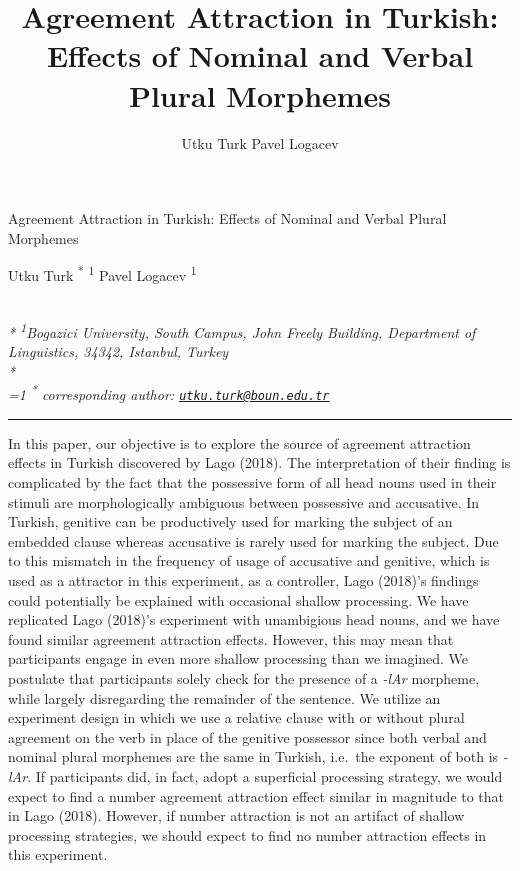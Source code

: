\documentclass[11pt,a4paper]{article}
\title{Agreement Attraction in Turkish: Effects of Nominal and Verbal Plural
Morphemes}
\author{
Utku Turk
Pavel Logacev
}
\date{}
\begin{document}
\begin{singlespace}
\begin{center}
\huge Agreement Attraction in Turkish: Effects of Nominal and Verbal Plural
Morphemes
\end{center}
\begin{center}
\large
Utku Turk \textsuperscript{*} \textsuperscript{1} 
Pavel Logacev \textsuperscript{1} 
\end{center}
\begin{justify}
\footnotesize \emph{ 
\\*
\textsuperscript{1}Bogazici University, South Campus, John Freely Building, Department of
Linguistics, 34342, Istanbul, Turkey\\*
}
\setcounter{num}{1}
\\[0.1cm]
\footnotesize \emph{ 
\ifnum\value{num}=1%
\textsuperscript{*} corresponding author:
\fi
\href{mailto:utku.turk@boun.edu.tr}{\nolinkurl{utku.turk@boun.edu.tr}}
}
\end{justify}
\normalsize

\end{singlespace}


\vspace{2mm}\hrule

In this paper, our objective is to explore the source of agreement
attraction effects in Turkish discovered by Lago (2018). The
interpretation of their finding is complicated by the fact that the
possessive form of all head nouns used in their stimuli are
morphologically ambiguous between possessive and accusative. In Turkish,
genitive can be productively used for marking the subject of an embedded
clause whereas accusative is rarely used for marking the subject. Due to
this mismatch in the frequency of usage of accusative and genitive,
which is used as a attractor in this experiment, as a controller, Lago
(2018)'s findings could potentially be explained with occasional shallow
processing. We have replicated Lago (2018)'s experiment with unambigious
head nouns, and we have found similar agreement attraction effects.
However, this may mean that participants engage in even more shallow
processing than we imagined. We postulate that participants solely check
for the presence of a \emph{-lAr} morpheme, while largely disregarding
the remainder of the sentence. We utilize an experiment design in which
we use a relative clause with or without plural agreement on the verb in
place of the genitive possessor since both verbal and nominal plural
morphemes are the same in Turkish, i.e.~the exponent of both is
\emph{-lAr}. If participants did, in fact, adopt a superficial
processing strategy, we would expect to find a number agreement
attraction effect similar in magnitude to that in Lago (2018). However,
if number attraction is not an artifact of shallow processing
strategies, we should expect to find no number attraction effects in
this experiment.
\end{document}
